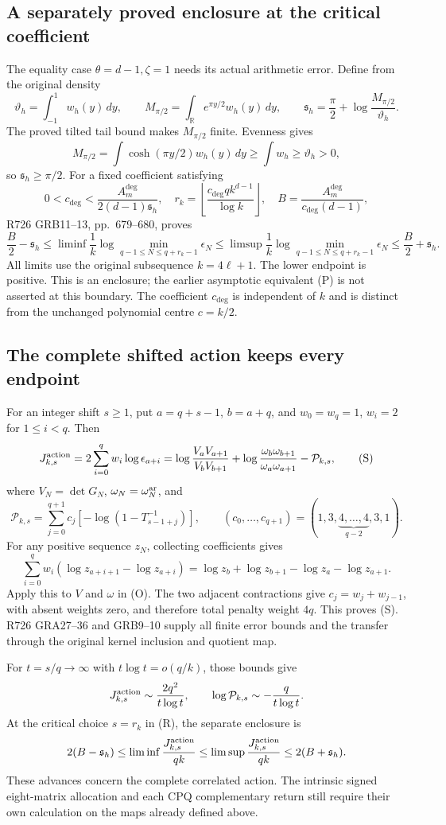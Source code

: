 \subsection{A separately proved enclosure at the critical coefficient}
The equality case \(\theta=d-1,\zeta=1\) needs its actual
arithmetic error. Define from the original density
\[
 \vartheta_h=\int_{-1}^1w_h(y)\,dy,\qquad
 M_{\pi/2}=\int_{\mathbb R}e^{\pi y/2}w_h(y)\,dy,
 \qquad\mathfrak s_h=\frac\pi2+
       \log\frac{M_{\pi/2}}{\vartheta_h}.
\]
The proved tilted tail bound makes \(M_{\pi/2}\) finite.
Evenness gives
\[
M_{\pi/2}=\int\cosh(\pi y/2)w_h(y)\,dy
\ge\int w_h\ge\vartheta_h>0,
\]
so \(\mathfrak s_h\ge\pi/2\).
For a fixed coefficient satisfying
\[
 0<c_{\deg}<\frac{A_m^{\deg}}{2(d-1)\mathfrak s_h},\quad
 r_k=\left\lfloor\frac{c_{\deg}qk^{d-1}}{\log k}\right\rfloor,
 \quad B=\frac{A_m^{\deg}}{c_{\deg}(d-1)},
\]
R726 GRB11--13, pp.~679--680, proves
\[
 \frac B2-\mathfrak s_h
 \le\liminf\frac1k\log\min_{q-1\le N\le q+r_k-1}\epsilon_N
 \le\limsup\frac1k\log\min_{q-1\le N\le q+r_k-1}\epsilon_N
 \le\frac B2+\mathfrak s_h.
\tag{R}
\]
All limits use the original subsequence \(k=4\ell+1\).
The lower endpoint is positive. This is an enclosure; the earlier
asymptotic equivalent (P) is not asserted at this boundary. The coefficient
\(c_{\deg}\) is independent of \(k\) and is distinct from the
unchanged polynomial centre \(c=k/2\).

\subsection{The complete shifted action keeps every endpoint}
For an integer shift \(s\ge1\), put \(a=q+s-1\), \(b=a+q\),
and \(w_0=w_q=1\), \(w_i=2\) for \(1\le i<q\). Then
\[
 J_{k,s}^{\rm action}=2\sum_{i=0}^q w_i\log\epsilon_{a+i}
 =\log\frac{V_aV_{a+1}}{V_bV_{b+1}}
  +\log\frac{\omega_b\omega_{b+1}}{\omega_a\omega_{a+1}}
  -\mathcal P_{k,s},
\tag{S}
\]
where \(V_N=\det G_N\), \(\omega_N=\omega_N^{\rm ar}\), and
\[
 \mathcal P_{k,s}=
 \sum_{j=0}^{q+1}c_j[-\log(1-T_{s-1+j}^{-1})],\qquad
 (c_0,\ldots,c_{q+1})=(1,3,\underbrace{4,\ldots,4}_{q-2},3,1).
\]
For any positive sequence \(z_N\), collecting coefficients gives
\[
 \sum_{i=0}^q w_i(\log z_{a+i+1}-\log z_{a+i})
 =\log z_b+\log z_{b+1}-\log z_a-\log z_{a+1}.
\]
Apply this to \(V\) and \(\omega\) in (O). The two adjacent
contractions give \(c_j=w_j+w_{j-1}\), with absent weights zero,
and therefore total penalty weight \(4q\). This proves (S).
R726 GRA27--36 and GRB9--10 supply all finite error bounds and the
transfer through the original kernel inclusion and quotient map.

For \(t=s/q\to\infty\) with \(t\log t=o(q/k)\), those bounds give
\[
 J_{k,s}^{\rm action}\sim\frac{2q^2}{t\log t},\qquad
 \log\mathcal P_{k,s}\sim-\frac{q}{t\log t}.
\]
At the critical choice \(s=r_k\) in (R), the separate enclosure is
\[
 2(B-\mathfrak s_h)\le
 \liminf\frac{J_{k,s}^{\rm action}}{qk}\le
 \limsup\frac{J_{k,s}^{\rm action}}{qk}\le2(B+\mathfrak s_h).
\]
These advances concern the complete correlated action. The intrinsic
signed eight-matrix allocation and each CPQ complementary return still
require their own calculation on the maps already defined above.
